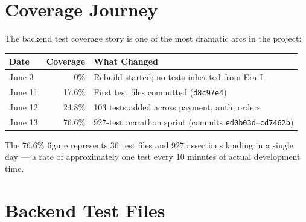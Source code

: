 \documentclass[11pt,a4paper,twoside]{book}
\newcommand{\th}[1]{\textbf{\color{white}#1}}
\begin{document}
\section{Coverage Journey}

The backend test coverage story is one of the most dramatic arcs in the project:

\begin{center}\small
\begin{tabular}{lrl}
\toprule
\rowcolor{headbg}\th{Date} & \th{Coverage} & \th{What Changed} \\
\midrule
June 3  & 0\%    & Rebuild started; no tests inherited from Era I \\
\rowcolor{rowalt}June 11 & 17.6\% & First test files committed (\texttt{d8c97e4}) \\
June 12 & 24.8\% & 103 tests added across payment, auth, orders \\
\rowcolor{rowalt}June 13 & 76.6\% & 927-test marathon sprint (commits \texttt{ed0b03d}–\texttt{cd7462b}) \\
\bottomrule
\end{tabular}
\end{center}

The 76.6\% figure represents 36 test files and 927 assertions landing in a
single day — a rate of approximately one test every 10 minutes of actual
development time.

\section{Backend Test Files}
\end{document}
